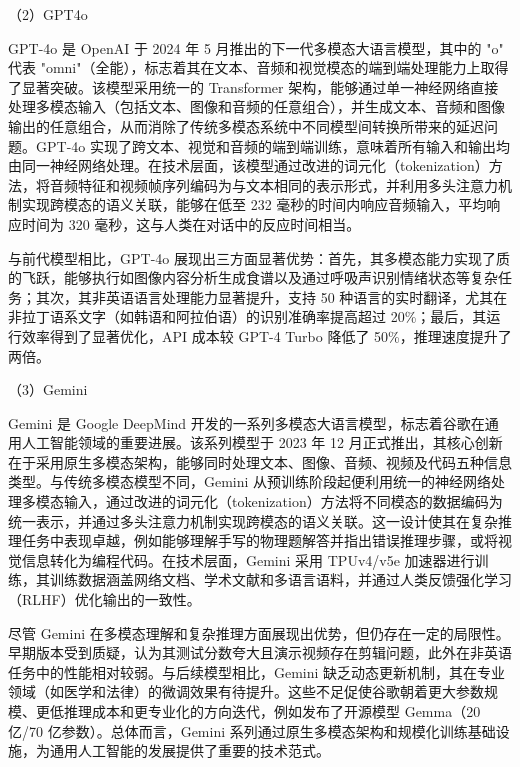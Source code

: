（2）GPT4o
\label{sec:TOSWT-gen-gpt4o}

GPT-4o \cite{gpt4o} 是 OpenAI 于 2024 年 5 月推出的下一代多模态大语言模型，其中的 "o" 代表 "omni"（全能），标志着其在文本、音频和视觉模态的端到端处理能力上取得了显著突破。该模型采用统一的 Transformer 架构，能够通过单一神经网络直接处理多模态输入（包括文本、图像和音频的任意组合），并生成文本、音频和图像输出的任意组合，从而消除了传统多模态系统中不同模型间转换所带来的延迟问题。GPT-4o 实现了跨文本、视觉和音频的端到端训练，意味着所有输入和输出均由同一神经网络处理。在技术层面，该模型通过改进的词元化（tokenization）方法，将音频特征和视频帧序列编码为与文本相同的表示形式，并利用多头注意力机制实现跨模态的语义关联，能够在低至 232 毫秒的时间内响应音频输入，平均响应时间为 320 毫秒，这与人类在对话中的反应时间相当。

与前代模型相比，GPT-4o 展现出三方面显著优势：首先，其多模态能力实现了质的飞跃，能够执行如图像内容分析生成食谱以及通过呼吸声识别情绪状态等复杂任务；其次，其非英语语言处理能力显著提升，支持 50 种语言的实时翻译，尤其在非拉丁语系文字（如韩语和阿拉伯语）的识别准确率提高超过 20\%；最后，其运行效率得到了显著优化，API 成本较 GPT-4 Turbo 降低了 50\%，推理速度提升了两倍。

（3）Gemini
\label{sec:TOSWT-gen-gemini}

Gemini \cite{geminiteam2024geminifamilyhighlycapable} 是 Google DeepMind 开发的一系列多模态大语言模型，标志着谷歌在通用人工智能领域的重要进展。该系列模型于 2023 年 12 月正式推出，其核心创新在于采用原生多模态架构，能够同时处理文本、图像、音频、视频及代码五种信息类型。与传统多模态模型不同，Gemini 从预训练阶段起便利用统一的神经网络处理多模态输入，通过改进的词元化（tokenization）方法将不同模态的数据编码为统一表示，并通过多头注意力机制实现跨模态的语义关联。这一设计使其在复杂推理任务中表现卓越，例如能够理解手写的物理题解答并指出错误推理步骤，或将视觉信息转化为编程代码。在技术层面，Gemini 采用 TPUv4/v5e 加速器进行训练，其训练数据涵盖网络文档、学术文献和多语言语料，并通过人类反馈强化学习 \cite{kaufmann2024surveyreinforcementlearninghuman} （RLHF）优化输出的一致性。

尽管 Gemini 在多模态理解和复杂推理方面展现出优势，但仍存在一定的局限性。早期版本受到质疑，认为其测试分数夸大且演示视频存在剪辑问题，此外在非英语任务中的性能相对较弱。与后续模型相比，Gemini 缺乏动态更新机制，其在专业领域（如医学和法律）的微调效果有待提升。这些不足促使谷歌朝着更大参数规模、更低推理成本和更专业化的方向迭代，例如发布了开源模型 Gemma（20 亿/70 亿参数）。总体而言，Gemini 系列通过原生多模态架构和规模化训练基础设施，为通用人工智能的发展提供了重要的技术范式。

